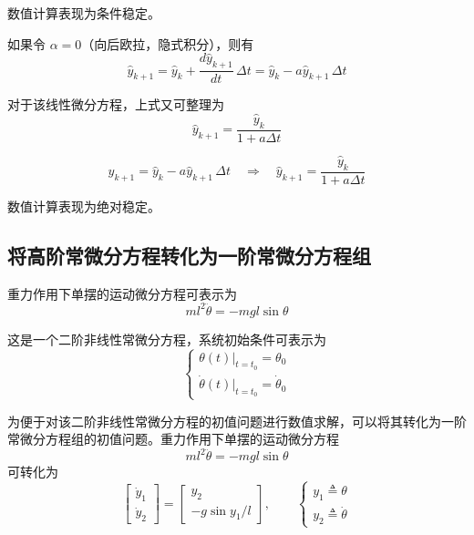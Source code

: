 数值计算表现为条件稳定。


如果令 $\alpha = 0$（向后欧拉，隐式积分），则有
\begin{equation}
\hat{y}_{k+1} = \hat{y}_k + \frac{d\hat{y}_{k+1}}{dt}\, \Delta t = \hat{y}_k - a\hat{y}_{k+1}\, \Delta t
\end{equation}

对于该线性微分方程，上式又可整理为
\begin{equation}
\hat{y}_{k+1} = \frac{\hat{y}_k}{1 + a\Delta t}
\end{equation}

\begin{myformula}
\begin{equation}\label{eq:3.backward_euler}
\hat{y}_{k+1} = \hat{y}_k - a\hat{y}_{k+1}\, \Delta t \quad \Rightarrow \quad \hat{y}_{k+1} = \frac{\hat{y}_k}{1 + a\Delta t}
\end{equation}
\end{myformula}

数值计算表现为绝对稳定。



\subsection{将高阶常微分方程转化为一阶常微分方程组}

重力作用下单摆的运动微分方程可表示为
\begin{equation}
ml^2 \ddot{\theta} = -mgl \sin\theta
\end{equation}

这是一个二阶非线性常微分方程，系统初始条件可表示为
\begin{equation}
\begin{cases}
\theta(t)\big|_{t=t_0} = \theta_0 \\[4pt]
\dot{\theta}(t)\big|_{t=t_0} = \dot{\theta}_0
\end{cases}
\end{equation}

为便于对该二阶非线性常微分方程的初值问题进行数值求解，可以将其转化为一阶常微分方程组的初值问题。重力作用下单摆的运动微分方程
\begin{equation*}
ml^2 \ddot{\theta} = -mgl \sin\theta
\end{equation*}
可转化为
\begin{equation}
\begin{bmatrix} \dot{y}_1 \\[4pt] \dot{y}_2 \end{bmatrix} = \begin{bmatrix} y_2 \\[4pt] -g \sin y_1 / l \end{bmatrix}, \qquad
\begin{cases} y_1 \triangleq \theta \\ y_2 \triangleq \dot{\theta} \end{cases}
\end{equation}

